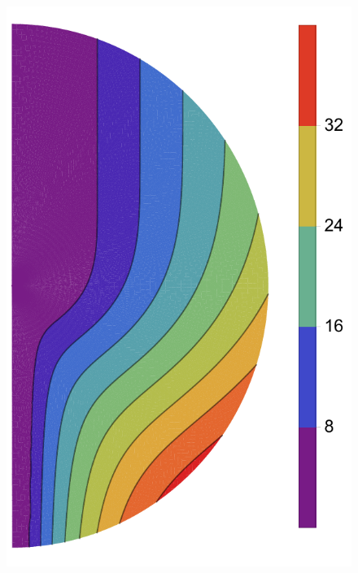 \documentclass[extra]{gji}
\begin{document}
\begin{figure}
  \centering
  \begin{minipage}{0.22\textwidth}
    \centering
    \includegraphics[width=\textwidth]{fig/nu24/ns.pdf}
  \end{minipage}\quad\quad\ %
  \begin{minipage}{0.22\textwidth}
    \centering

\end{minipage}
\end{figure}
\end{document}
